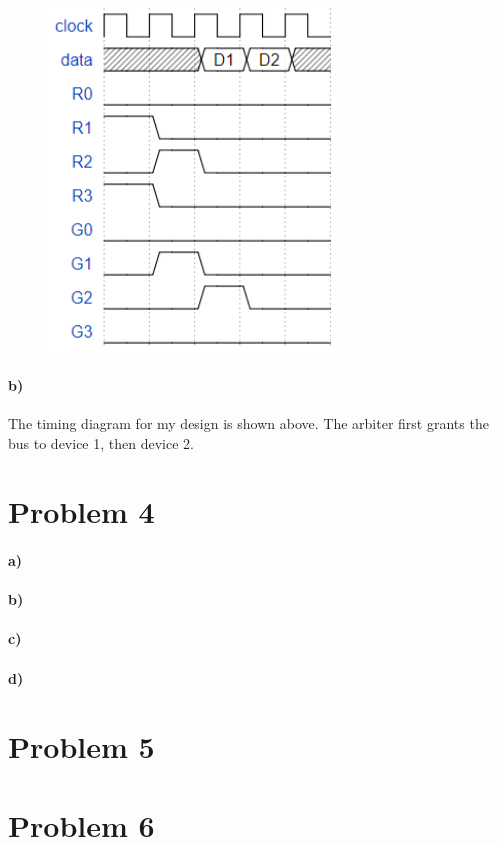 \documentclass[12pt]{article}
\begin{document}
\begin{figure}[!ht]
        \begin{center}
                \includegraphics[width=3in]{problem3b.png}
        \end{center}
\end{figure}

\paragraph{b)}

The timing diagram for my design is shown above. The arbiter first grants the bus to device 1, then device 2.

\section*{Problem 4}

\paragraph{a)}

\paragraph{b)}

\paragraph{c)}

\paragraph{d)}

\section*{Problem 5}

\section*{Problem 6}
\end{document}
